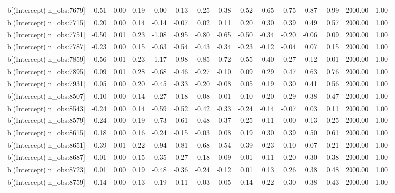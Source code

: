 \begin{table}[ht]
\begin{tabular}{rrrrrrrrrrrrrrr}
  b[(Intercept) n\_obs:7679] & 0.51 & 0.00 & 0.19 & -0.00 & 0.13 & 0.25 & 0.38 & 0.52 & 0.65 & 0.75 & 0.87 & 0.99 & 2000.00 & 1.00 \\ 
  b[(Intercept) n\_obs:7715] & 0.20 & 0.00 & 0.14 & -0.14 & -0.07 & 0.02 & 0.11 & 0.20 & 0.30 & 0.39 & 0.49 & 0.57 & 2000.00 & 1.00 \\ 
  b[(Intercept) n\_obs:7751] & -0.50 & 0.01 & 0.23 & -1.08 & -0.95 & -0.80 & -0.65 & -0.50 & -0.34 & -0.20 & -0.06 & 0.09 & 2000.00 & 1.00 \\ 
  b[(Intercept) n\_obs:7787] & -0.23 & 0.00 & 0.15 & -0.63 & -0.54 & -0.43 & -0.34 & -0.23 & -0.12 & -0.04 & 0.07 & 0.15 & 2000.00 & 1.00 \\ 
  b[(Intercept) n\_obs:7859] & -0.56 & 0.01 & 0.23 & -1.17 & -0.98 & -0.85 & -0.72 & -0.55 & -0.40 & -0.27 & -0.12 & -0.01 & 2000.00 & 1.00 \\ 
  b[(Intercept) n\_obs:7895] & 0.09 & 0.01 & 0.28 & -0.68 & -0.46 & -0.27 & -0.10 & 0.09 & 0.29 & 0.47 & 0.63 & 0.76 & 2000.00 & 1.00 \\ 
  b[(Intercept) n\_obs:7931] & 0.05 & 0.00 & 0.20 & -0.45 & -0.33 & -0.20 & -0.08 & 0.05 & 0.19 & 0.30 & 0.41 & 0.56 & 2000.00 & 1.00 \\ 
  b[(Intercept) n\_obs:8507] & 0.10 & 0.00 & 0.14 & -0.27 & -0.18 & -0.08 & 0.01 & 0.10 & 0.20 & 0.29 & 0.38 & 0.47 & 2000.00 & 1.00 \\ 
  b[(Intercept) n\_obs:8543] & -0.24 & 0.00 & 0.14 & -0.59 & -0.52 & -0.42 & -0.33 & -0.24 & -0.14 & -0.07 & 0.03 & 0.11 & 2000.00 & 1.00 \\ 
  b[(Intercept) n\_obs:8579] & -0.24 & 0.00 & 0.19 & -0.73 & -0.61 & -0.48 & -0.37 & -0.25 & -0.11 & -0.00 & 0.13 & 0.25 & 2000.00 & 1.00 \\ 
  b[(Intercept) n\_obs:8615] & 0.18 & 0.00 & 0.16 & -0.24 & -0.15 & -0.03 & 0.08 & 0.19 & 0.30 & 0.39 & 0.50 & 0.61 & 2000.00 & 1.00 \\ 
  b[(Intercept) n\_obs:8651] & -0.39 & 0.01 & 0.22 & -0.94 & -0.81 & -0.68 & -0.54 & -0.39 & -0.23 & -0.10 & 0.07 & 0.21 & 2000.00 & 1.00 \\ 
  b[(Intercept) n\_obs:8687] & 0.01 & 0.00 & 0.15 & -0.35 & -0.27 & -0.18 & -0.09 & 0.01 & 0.11 & 0.20 & 0.30 & 0.38 & 2000.00 & 1.00 \\ 
  b[(Intercept) n\_obs:8723] & 0.01 & 0.00 & 0.19 & -0.48 & -0.36 & -0.24 & -0.12 & 0.01 & 0.13 & 0.26 & 0.38 & 0.48 & 2000.00 & 1.00 \\ 
  b[(Intercept) n\_obs:8759] & 0.14 & 0.00 & 0.13 & -0.19 & -0.11 & -0.03 & 0.05 & 0.14 & 0.22 & 0.30 & 0.38 & 0.43 & 2000.00 & 1.00 \\ 

\end{tabular}
\end{table}
